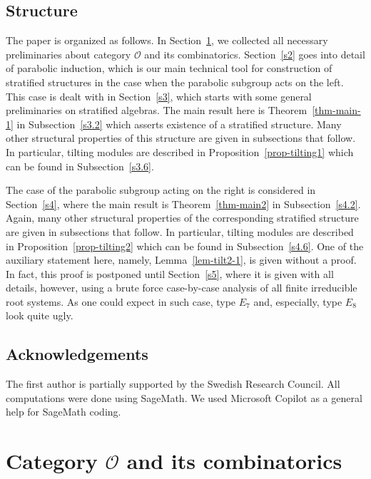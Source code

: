 \documentclass[a4paper]{amsart}
\begin{document}
\subsection{Structure}\label{s0.5}

The paper is organized as follows. 
In Section~\ref{s1}, we collected all necessary preliminaries about 
category $\mathcal{O}$ and its combinatorics.
Section~\ref{s2} goes into detail of parabolic induction, which is 
our main technical tool for construction of stratified structures
in the case when the parabolic subgroup acts on the left.
This case is dealt with in Section~\ref{s3}, which starts with some 
general preliminaries on stratified algebras. The main result here
is Theorem~\ref{thm-main-1} in Subsection~\ref{s3.2} which 
asserts existence of a stratified structure. Many other 
structural properties of this structure are given in 
subsections that follow. In particular, tilting modules are described
in Proposition~\ref{prop-tilting1} which can be found in 
Subsection~\ref{s3.6}.

The case of the parabolic subgroup acting on the right is considered 
in Section~\ref{s4}, where the main result is 
Theorem~\ref{thm-main2} in  Subsection~\ref{s4.2}.
Again, many other  structural properties of the
corresponding stratified structure are given in 
subsections that follow. In particular, tilting modules are described
in Proposition~\ref{prop-tilting2} which can be found in 
Subsection~\ref{s4.6}. One of the auxiliary statement here,
namely, Lemma~\ref{lem-tilt2-1}, is given without a proof.
In fact, this proof is postponed until Section~\ref{s5},
where it is given with all details, however, using a 
brute force case-by-case analysis of all finite irreducible
root systems. As one could expect in such case, type $E_7$
and, especially, type $E_8$ look quite ugly.

\subsection*{Acknowledgements}
The first author is partially supported by the Swedish Research Council.
All computations were done using SageMath. We used Microsoft Copilot
as a general help for SageMath coding.
\vspace{5mm}

\section{Category $\mathcal{O}$ and its combinatorics}\label{s1}
\end{document}
